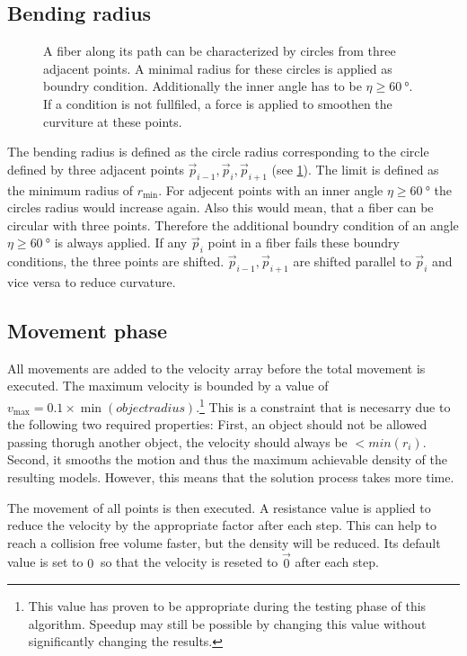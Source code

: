 \subsection{Bending radius}
%
\begin{figure}[!t]
    \centering
    \setlength{\tikzheight}{.75\textwidth}
	\caption{A fiber along its path can be characterized by circles from three adjacent points. A minimal radius for these circles is applied as boundry condition. Additionally the inner angle has to be $\eta \geq \SI{60}{\degree}$. If a condition is not fullfiled, a force is applied to smoothen the curviture at these points.}
	\label{fig:modelCircle}
\end{figure}
%
The bending radius is defined as the circle radius corresponding to the circle defined by three adjacent points $\vec{p}_{i-1}, \vec{p}_{i}, \vec{p}_{i+1}$ (see \cref{fig:modelCircle}).
The limit is defined as the minimum radius of $r_{\min}$.
For adjecent points with an inner angle $\eta \geq \SI{60}{\degree}$ the circles radius would increase again.
Also this would mean, that a fiber can be circular with three points.
Therefore the additional boundry condition of an angle $\eta \geq \SI{60}{\degree}$ is always applied.
If any $\vec{p}_{i}$ point in a fiber fails these boundry conditions, the three points are shifted.
$\vec{p}_{i-1},\vec{p}_{i+1}$ are shifted parallel to $\vec{p}_{i}$ and vice versa to reduce curvature.
%
% 
% 
\subsection{Movement phase}
% 
All movements are added to the velocity array before the total movement is executed.
The maximum velocity is bounded by a value of $v_{\max} = 0.1 \times \min(\mathit{object radius})$.\footnote{This value has proven to be appropriate during the testing phase of this algorithm. Speedup may still be possible by changing this value without significantly changing the results.}
This is a constraint that is necesarry due to the following two required properties:
First, an object should not be allowed passing thorugh another object, \ie{} the velocity should always be $<min(r_i)$.
Second, it smooths the motion and thus the maximum achievable density of the resulting models.
However, this means that the solution process takes more time.
\par
The movement of all points is then executed.
A resistance value is applied to reduce the velocity by the appropriate factor after each step.
This can help to reach a collision free volume faster, but the density will be reduced.
Its default value is set to $\SI{0}{}$ so that the velocity is reseted to $\vec{0}$ after each step.
% 
% 
% 
